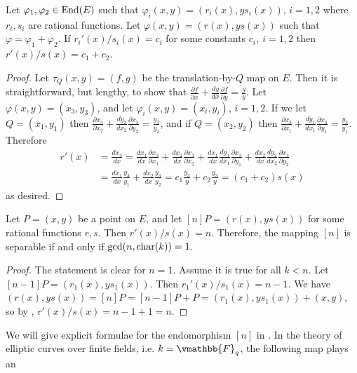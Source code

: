 \begin{lemma}
\label{lemma:mult-by-n-diff}
Let $\varphi_1, \varphi_2 \in \operatorname{End}(E)$ such that $\varphi_i(x, y) = (r_i(x), ys_i(x))$, $i = 
1, 2$ where $r_i, s_i$ are rational functions. Let $\varphi(x, y) = (r(x), ys(x))$ such that 
$\varphi = \varphi_1 + \varphi_2$. If $r_i'(x) / s_i(x) = c_i$ for some constants $c_i, \: i = 1, 2$ 
then $r'(x) / s(x) = c_1 + c_2$.
\end{lemma}
\begin{proof}
Let $\tau_Q(x, y) = (f, g)$ be the translation-by-$Q$ map on $E$. Then it is straightforward, but 
lengthy, to show that $\frac{\partial f}{\partial x} + \frac{dy}{dx}\frac{\partial f}{\partial y} = 
\frac{g}{y}$. Let $\varphi(x, y) = (x_3, y_3)$, and let $\varphi_i(x, y) = (x_i, y_i)$, $i = 1, 2$. 
If we let $Q = (x_1, y_1)$ then $\frac{\partial x_3}{\partial x_2} + \frac{dy_2}{dx_2}\frac{\partial 
x_3}{\partial y_2} = \frac{y_3}{y_2}$, and if $Q = (x_2, y_2)$ then $\frac{\partial x_3}{\partial 
x_1} + \frac{dy_1}{dx_1}\frac{\partial x_3}{\partial y_1} = \frac{y_3}{y_1}$. Therefore
\begin{align*}
r'(x) 
&= \frac{dx_3}{dx} = \frac{dx_1}{dx}\frac{\partial x_3}{\partial x_1} + 
\frac{dx_2}{dx}\frac{\partial x_3}{\partial x_2} + \frac{dx_1}{dx}\frac{dy_1}{dx_1}\frac{\partial 
x_3}{\partial y_1} + \frac{dx_2}{dx}\frac{dy_2}{dx_2}\frac{\partial x_3}{\partial y_2} \\
&= \frac{dx_1}{dx}\frac{y_3}{y_1} + \frac{dx_2}{dx}\frac{y_3}{y_2} = c_1\frac{y_3}{y} + 
c_2\frac{y_3}{y} = (c_1 + c_2)s(x)
\end{align*}
as desired.
\end{proof}
\begin{corollary}
\label{corollary:mult-by-n}
Let $P = (x, y)$ be a point on $E$, and let $[n]P = (r(x), ys(x))$ for some rational functions $r, 
s$. Then $r'(x) / s(x) = n$. Therefore, the mapping $[n]$ is separable if and only if $\gcd(n, 
\operatorname{char}(k)) = 1$.
\end{corollary}
\begin{proof}
The statement is clear for $n = 1$. Assume it is true for all $k < n$. Let $[n - 1]P = (r_1(x), 
ys_1(x))$. Then $r_1'(x) / s_1(x) = n - 1$. We have $(r(x), ys(x)) = [n]P = [n - 1]P + P = (r_1(x), 
ys_1(x)) + (x, y)$, so by , $r'(x) / s(x) = n - 1 + 1 = n$.
\end{proof}
We will give explicit formulae for the endomorphism $[n]$ in . In the 
theory of elliptic curves over finite fields, i.e. $k = \vmathbb{F}_q$, the following map plays an 
